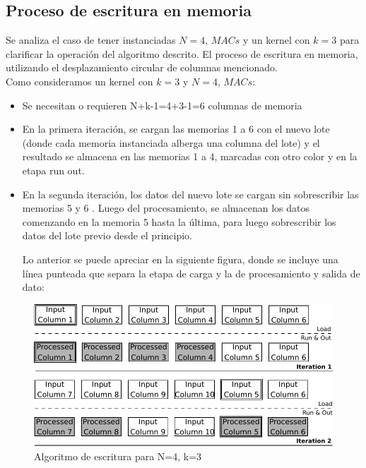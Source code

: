 \bigskip
\bigskip
\bigskip

\subsection{Proceso de escritura en memoria}  \label{writing_subsecc}
\smallskip
Se analiza el caso de tener instanciadas $N=4$, $MACs$ y un kernel con $k=3$ para clarificar la operación del algoritmo descrito.
El proceso de escritura en memoria, utilizando el desplazamiento circular de columnas mencionado.\\

Como consideramos un kernel con $k=3$ y $N=4$, $MACs$:
\begin{frame}{}
	    
      \begin{itemize}
        \item Se necesitan o requieren N+k-1=4+3-1=6 columnas de memoria
	\item En la primera iteración, se cargan las memorias 1 a 6 con el nuevo lote (donde cada memoria instanciada alberga una columna del lote) y el resultado se almacena en las memorias 1 a 4, marcadas con otro color y en la etapa run  out.
	\item En la segunda iteración, los datos del nuevo lote se cargan sin sobrescribir las memorias 5 y 6 . Luego del procesamiento, se almacenan los datos comenzando en la memoria  5 hasta la última, para luego sobrescribir los datos del lote previo desde el principio.

\bigskip
\bigskip
Lo anterior se puede apreciar en la siguiente figura, donde se incluye una línea punteada que separa la etapa de carga y la de procesamiento y salida de dato:

\end{itemize}
\end{frame}

\begin{figure}
\centering
\includegraphics[scale=0.8]{algorithm}
\caption{Algoritmo de escritura para N=4, k=3 }
\label{writingprocess1}
\end{figure}

